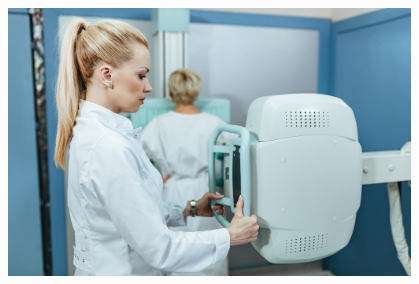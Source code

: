 \begin{myquote}





\begin{figure}[H]
\centering
\includegraphics[width=0.95\textwidth]{./imgSAEB_7_POR/media/image71.png}
\end{figure} 


\end{myquote}
